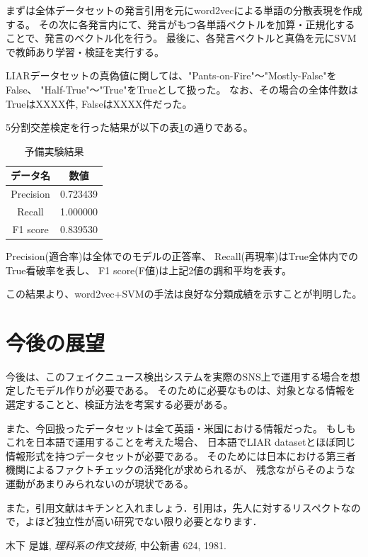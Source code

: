 \documentclass[twocolumn, a4paper, uplatex]{UECIEresume}
\begin{document}
まずは全体データセットの発言引用を元にword2vecによる単語の分散表現を作成する。
その次に各発言内にて、発言がもつ各単語ベクトルを加算・正規化することで、発言のベクトル化を行う。
最後に、各発言ベクトルと真偽を元にSVMで教師あり学習・検証を実行する。

LIARデータセットの真偽値に関しては、"Pants-on-Fire"〜"Mostly-False"をFalse、
"Half-True"〜"True"をTrueとして扱った。
なお、その場合の全体件数はTrueはXXXX件, FalseはXXXX件だった。

5分割交差検定を行った結果が以下の表\ref{tb:result}の通りである。

\begin{table}[h]
  \begin{center}
    \caption{予備実験結果}
    \label{tb:result}
    \begin{tabular}{c c}
      \hline
      データ名 & 数値 \\
      \hline \hline
      Precision & 0.723439 \\
      Recall & 1.000000 \\
      F1 score & 0.839530 \\
      \hline
    \end{tabular}
  \end{center}
\end{table}

Precision(適合率)は全体でのモデルの正答率、
Recall(再現率)はTrue全体内でのTrue看破率を表し、
F1 score(F値)は上記2値の調和平均を表す。

この結果より、word2vec+SVMの手法は良好な分類成績を示すことが判明した。

\section{今後の展望}
今後は、このフェイクニュース検出システムを実際のSNS上で運用する場合を想定したモデル作りが必要である。
そのために必要なものは、対象となる情報を選定することと、検証方法を考案する必要がある。

また、今回扱ったデータセットは全て英語・米国における情報だった。
もしもこれを日本語で運用することを考えた場合、
日本語でLIAR datasetとほぼ同じ情報形式を持つデータセットが必要である。
そのためには日本における第三者機関によるファクトチェックの活発化が求められるが、
残念ながらそのような運動があまりみられないのが現状である。

また，引用文献はキチンと入れましょう\cite{Kinoshita1}．引用は，先人に対するリスペクトなので，よほど独立性が高い研究でない限り必要となります．

{\small
\begin{thebibliography}{*}
 木下 是雄, \textit{理科系の作文技術}, 中公新書 624, 1981.
\end{thebibliography}
}
\end{document}
